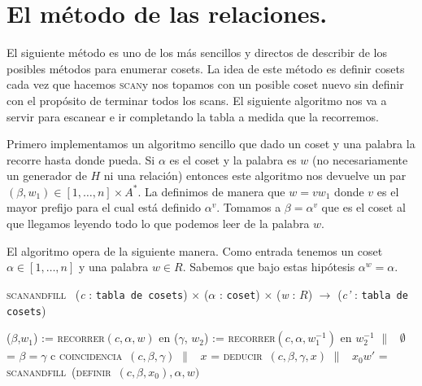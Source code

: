 \documentclass[tesis.tex]{subfiles}
\newcommand{\coin}{\textsc{coincidencia}}
\newcommand{\scan}{\textsc{scan}}
\newcommand{\definir}{\textsc{definir}}
\newcommand{\scanfill}{\textsc{scanandfill}}
\newcommand{\ded}{\textsc{deducir}}
\newcommand{\recorrer}{\textsc{recorrer}}
\begin{document}
\section{El método de las relaciones.}

El siguiente método es uno de los más sencillos y directos de describir de los posibles métodos para enumerar cosets.
La idea de este método es definir cosets cada vez que hacemos \scan y nos topamos con un posible coset nuevo sin definir con el propósito de terminar todos los scans.
El siguiente algoritmo nos va a servir para escanear e ir completando la tabla a medida que la recorremos.


Primero implementamos un algoritmo sencillo que dado un coset y una palabra la recorre hasta donde pueda.
Si $\alpha$ es el coset y la palabra es $w$ (no necesariamente un generador de $H$ ni una relación) entonces este algoritmo nos devuelve un par $(\beta, w_1) \in [1, \dots, n] \times A^{*}$.
La definimos de manera que $w = vw_1$ donde $v$ es el mayor prefijo para el cual está definido $\alpha^v$.
Tomamos a $\beta = \alpha^v$ que es el coset al que llegamos leyendo todo lo que podemos leer de la palabra $w$.


El algoritmo opera de la siguiente manera.
Como entrada tenemos un coset $\alpha \in [1, \dots, n]$ y una palabra $w \in R$.
Sabemos que bajo estas hipótesis $\alpha^w = \alpha$.


\begin{algorithm}[H]
	\caption{\textsc{scanandfill} \ (\textit{c} : \texttt{tabla de cosets}) $\times $ (\textit{$\alpha$} : \texttt{coset}) $\times$ (\textit{w} : \texttt{$R$}) $\longrightarrow$ (\textit{c'} : \texttt{tabla de cosets})}
	\begin{algorithmic}[1]
		\State {} ($\beta$,$w_1$) := \recorrer$(c, \alpha, w)$ en
		\Indent
			\State {} ($\gamma$, $w_2$) :=  \recorrer$(c,\alpha, w_1^{-1})$ en
			\Indent
				\State {} $w_2^{-1}$ 
				\State $\|$ \ $\emptyset$ =  $\beta = \gamma$  c  \coin \ $(c, \beta, \gamma)$
				\State $\|$ \ $x$ = \ded \ $(c,\beta, \gamma, x)$
				\State $\|$ \ $x_0w'$ = \scanfill \  (\definir \ $(c, \beta, x_0), \alpha, w)$ 
			\EndIndent
		\EndIndent 
	\end{algorithmic}
\end{algorithm}
\end{document}
